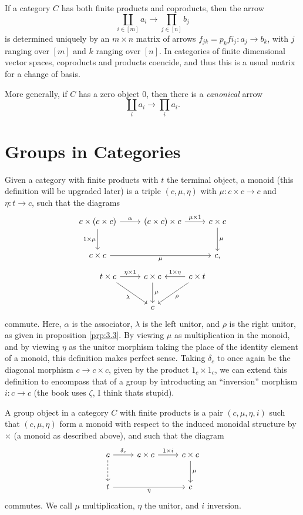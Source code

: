 If a category $C$ has both finite products and coproducts, then the arrow
\[
	\coprod_{i\in [m]}a_i \to \prod_{j\in [n]} b_j
\]
is determined uniquely by an $m\times n$ matrix of arrows $f_{jk} =p_kfi_j : a_j \to b_k$, with $j$ ranging over $[m]$ and $k$ ranging over $[n]$. In categories of finite dimensional vector spaces, coproducts and products coencide, and thus this is a usual matrix for a change of basis.

More generally, if $C$ has a zero object $0$, then there is a \emph{canonical} arrow
\[
	\coprod_{i}a_i \to \prod_{i} a_i
.\]

\section{Groups in Categories}

Given a category with finite products with $t$ the terminal object, a monoid (this definition will be upgraded later) is a triple $(c,\mu ,\eta )$ with $\mu : c\times c \to c$ and $\eta : t \to c$, such that the diagrams
\[\begin{tikzcd}[row sep = 2.5em, column sep = 2.5em]
c\times (c\times c)\ar[" \alpha  ", r] \ar[" 1\times \mu  "', d]  & (c\times c)\times c\ar[" \mu \times 1 ", r]  & c\times c\ar[" \mu  ", d]  \\
c\times c\ar[" \mu  "', rr]  & & c,
\end{tikzcd}\]
\[\begin{tikzcd}[row sep = 2.5em, column sep = 2.5em]
t\times c\ar[" \lambda  "', dr] \ar[" \eta \times 1 ", r]  & c\times c\ar[" \mu  ", d]  & c\times t \ar[" 1\times \eta  "', l] \ar[" \rho  ", dl]  \\
 & c & 
\end{tikzcd}\]
commute. Here, $\alpha $ is the associator, $\lambda $ is the left unitor, and $\rho $  is the right unitor, as given in proposition \ref{prp:3.3}. By viewing $\mu $ as multiplication in the monoid, and by viewing $\eta $ as the unitor morphism taking the place of the identity element of a monoid, this definition makes perfect sense. Taking $\delta _c$ to once again be the diagonal morphism $c\to c\times c$, given by the product $1_c\times 1_c$, we can extend this definition to encompass that of a group by introducting an ``inversion'' morphism $i : c \to c$ (the book uses $\zeta $, I think thats stupid).

\begin{definition}\label{dfn:3.6}
	A group object in a category $C$ with finite products is a pair $(c,\mu ,\eta ,i)$ such that $(c,\mu ,\eta )$ form a monoid with respect to the induced monoidal structure by $\times $ (a monoid as described above), and such that the diagram
	\[\begin{tikzcd}[row sep = 2.5em, column sep = 2.5em]
	c\ar[" \delta _c ", r] \ar[dashed, d]  & c\times c\ar[" 1\times i ", r]  & c\times c\ar[" \mu  ", d]  \\
	t\ar[" \eta  "', rr]  &  & c
	\end{tikzcd}\]
	commutes. We call $\mu $ multiplication, $\eta $ the unitor, and $i$ inversion.
\end{definition}

